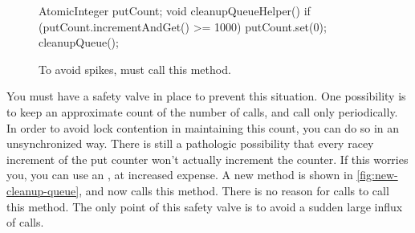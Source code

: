 \begin{wrapfigure}{r}{0.4\textwidth}
\centering
\begin{framedlisting}
AtomicInteger putCount;
void cleanupQueueHelper() {
  if (putCount.incrementAndGet() >= 1000) {
    putCount.set(0);
    cleanupQueue();
  }
}
\end{framedlisting}
\caption{To avoid spikes,  must call this method.}
\label{fig:new-cleanup-queue}
\end{wrapfigure}
You must have a safety valve in place to prevent this situation. One possibility
is to keep an approximate count of the number of  calls, and call
 only periodically. In order to avoid lock contention in
maintaining this count, you can do so in an unsynchronized way. There is still a
pathologic possibility that every racey increment of the put counter won't
actually increment the counter. If this worries you, you can use an
, at increased expense. A new 
method is shown in \autoref{fig:new-cleanup-queue}, and  now calls
this method. There is no reason for  calls to call this method. The
only point of this safety valve is to avoid a sudden large influx of  calls.




